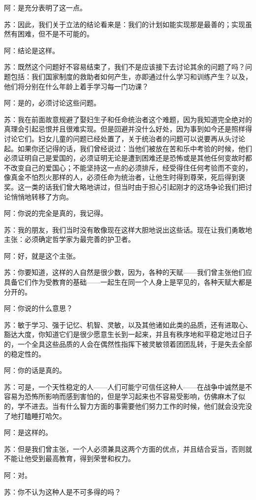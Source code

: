\documentclass[12pt,oneside]{book}
\begin{document}
阿：是充分表明了这一点。

苏：因此，我们关于立法的结论看来是：我们的计划如能实现那是最善的；实现虽然有困难，但不是不可能的。

阿：结论是这样。

苏：既然这个问题好不容易结束了，我们不是应该接下去讨论其余的问题了吗？问题包括：我们国家制度的救助者如何产生，亦即通过什么学习和训练产生？以及，他们将分别在什么年龄上着手学习每一门功课？

阿：是的，必须讨论这些问题。

苏：我在前面故意规避了娶妇生子和任命统治者这个难题，因为我知道完全绝对的真理会引起忌恨并且很难实现。但是回避并没什么好处，因为事到如今还是照样得讨论它们。妇女儿童的问题已经处置了，关于统治者的问题可以说要再从头讨论起。如果你还记得的话，我们曾经说过：当他们被放在苦和乐中考验的时候，他们必须证明自己是爱国的，必须证明无论是遭到困难还是恐怖或是其他任何变故时都不改变自己的爱国心；不能坚持这一点的必须排斥，经受得住任何考验而不变的，像真金不怕烈火那样的人，必须任命为统治者，让他生时得到尊荣，死后得到褒奖。这一类的话我们曾大略地讲过，但当时由于担心引起刚才的这场争论我们把讨论悄悄地转移了方向。

阿：你说的完全是真的，我记得。

苏：我的朋友，我们当时没有敢像现在这样大胆地说出这些话。现在让我们勇敢地主张：必须确定哲学家为最完善的护卫者。

阿：好，就是这个主张。

苏：你要知道，这样的人自然是很少数，因为，各种的天赋——我们曾主张他们应具备它们作为受教育的基础——一起生在同一个人身上是罕见的，各种天赋大都是分开的。

阿：你说的什么意思？

苏：敏于学习、强于记忆、机智、灵敏，以及其他诸如此类的品质，还有进取心、豁达大度，你知道它们是很少愿意生长到一起来，并且有秩序地和平稳定地过日子的，一个全具这些品质的人会在偶然性指挥下被灵敏领着团团乱转，于是失去全部的稳定性的。

阿：你的话是真的。

苏：可是，一个天性稳定的人——人们可能宁可信任这种人——在战争中诚然是不容易为恐怖所影响而感到害怕的，但是学习起来也不容易受影响，仿佛麻木了似的，学不进去。当有什么智力方面的事需要他们努力工作的时候，他们就会没完没了地打瞌睡打哈欠。

阿：是这样的。

苏：但是我们曾主张，一个人必须兼具这两个方面的优点，并且结合妥当，否则就不能让他受到最高教育，得到荣誉和权力。

阿：对。

苏：你不认为这种人是不可多得的吗？
\end{document}
